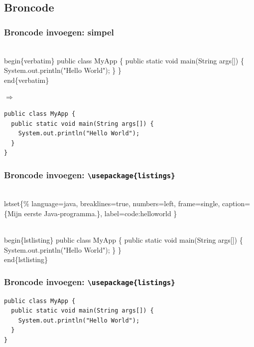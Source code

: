 \documentclass[aspectratio=169]{beamer}
\begin{document}
\subsection{Broncode}

\begin{frame}[fragile]
  \frametitle{Broncode invoegen: simpel}

\begin{semiverbatim}
\alert{\\begin\{verbatim\}}
public class MyApp \{
  public static void main(String args[]) \{
    System.out.println("Hello World");
  \}
\}
\alert{\\end\{verbatim\}}
\end{semiverbatim}
$\Rightarrow$
\begin{verbatim}
public class MyApp {
  public static void main(String args[]) {
    System.out.println("Hello World");
  }
}
\end{verbatim}  

\end{frame}

\begin{frame}[fragile]
  \frametitle{Broncode invoegen: \texttt{\textbackslash{}usepackage\{listings\}}}

\begin{semiverbatim}
\\lstset\{\%
  language=java,    breaklines=true,
  numbers=left,     frame=single,
  caption=\{Mijn eerste Java-programma.\},
  label=code:helloworld
\}

\alert{\\begin\{lstlisting\}}
public class MyApp \{
  public static void main(String args[]) \{
    System.out.println("Hello World");
  \}
\}
\alert{\\end\{lstlisting\}}
\end{semiverbatim}

\end{frame}

\begin{frame}[fragile]
  \frametitle{Broncode invoegen:  \texttt{\textbackslash{}usepackage\{listings\}}}


\begin{lstlisting}
public class MyApp {
  public static void main(String args[]) {
    System.out.println("Hello World");
  }
}
\end{lstlisting}

\end{frame}
\end{document}
